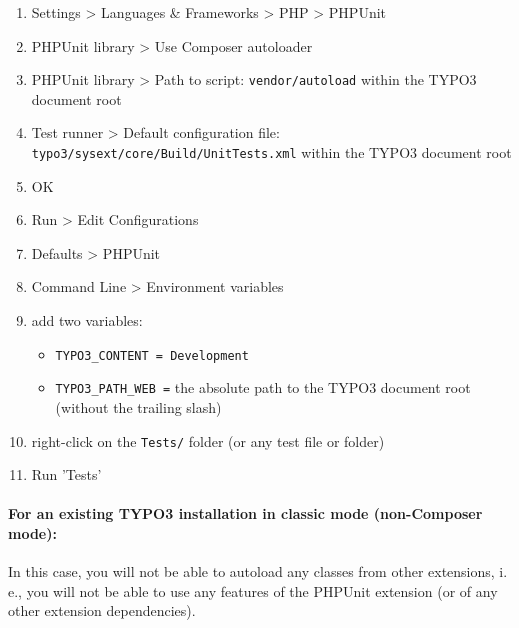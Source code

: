 \documentclass[a4paper,11pt,headsepline]{scrartcl}
\begin{document}
\begin{enumerate}
  \item Settings > Languages \& Frameworks > PHP > PHPUnit
  \item PHPUnit library > Use Composer autoloader
  \item PHPUnit library > Path to script: \texttt{vendor/autoload} within the TYPO3 document root
  \item Test runner > Default configuration file: \texttt{typo3/sysext/core/Build/UnitTests.xml} within the TYPO3 document root
  \item OK
  \item Run > Edit Configurations
  \item Defaults > PHPUnit
  \item Command Line > Environment variables
  \item add two variables:
    \begin{itemize}
      \item \texttt{TYPO3\_CONTENT = Development}
      \item \texttt{TYPO3\_PATH\_WEB =} the absolute path to the TYPO3 document root (without the trailing slash)
    \end{itemize}
  \item right-click on the \texttt{Tests/} folder (or any test file or folder)
  \item Run 'Tests'
\end{enumerate}


\paragraph{For an existing TYPO3 installation in classic mode (non-Composer mode):}

In this case, you will not be able to autoload any classes from other extensions, i.\,e., you will not be able to use any features of the PHPUnit extension (or of any other extension dependencies).
\end{document}
